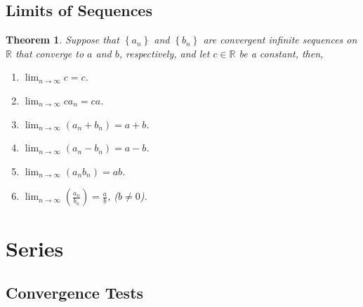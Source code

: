 \documentclass{article}
\theoremstyle{plain}
\newtheorem{theorem}{Theorem}[section]
\numberwithin{theorem}{section}
\theoremstyle{definition}
\numberwithin{definition}{section}
\newcommand*{\R}{\mathbb{R}}
\begin{document}
\subsection{Limits of Sequences}
\begin{theorem}
	Suppose that $\left\{a_n\right\}$ and $\left\{b_n\right\}$ are convergent infinite sequences on $\R$ that converge to $a$ and $b$, respectively, and let $c\in\R$ be a constant, then,
	\begin{enumerate}[label=\alph*)]
		\item $\lim_{n\rightarrow\infty}c=c$.
		\item $\lim_{n\rightarrow\infty}ca_n=ca$.
		\item $\lim_{n\rightarrow\infty}\left( a_n + b_n \right)=a+b$.
		\item $\lim_{n\rightarrow\infty}\left( a_n - b_n \right)=a-b$.
		\item $\lim_{n\rightarrow\infty}\left( a_nb_n \right)=ab$.
		\item $\lim_{n\rightarrow\infty}\left( \frac{a_n}{b_n} \right)=\frac{a}{b}$, ($b\neq 0$).
	\end{enumerate}
\end{theorem}

\section{Series}

%
\subsection{Convergence Tests}

%
\end{document}
